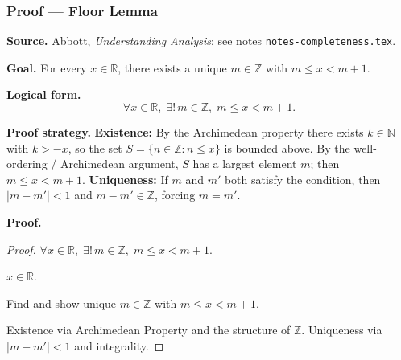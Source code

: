 
\clearpage
{}
\hypertarget{proof-RA-ABB-P-floor-lemma}{}

\subsubsection[Floor Lemma]{Proof --- Floor Lemma}

\bigskip

\noindent
\textbf{Source.}
Abbott, \emph{Understanding Analysis}; see notes \texttt{notes-completeness.tex}.

\vspace{0.75em}

\noindent
\textbf{Goal.}
For every $x \in \mathbb{R}$, there exists a unique $m \in \mathbb{Z}$ with
$m \le x < m + 1$.

\vspace{0.75em}

\noindent
\textbf{Logical form.}
\[
  \forall x \in \mathbb{R},\; \exists!\, m \in \mathbb{Z},\; m \le x < m+1.
\]

\vspace{0.75em}

\noindent
\textbf{Proof strategy.}
\textbf{Existence:} By the Archimedean property there exists $k \in \mathbb{N}$
with $k > -x$, so the set $S = \{n \in \mathbb{Z} : n \le x\}$ is bounded
above. By the well-ordering / Archimedean argument, $S$ has a largest element
$m$; then $m \le x < m + 1$.
\textbf{Uniqueness:} If $m$ and $m'$ both satisfy the condition, then
$|m - m'| < 1$ and $m - m' \in \mathbb{Z}$, forcing $m = m'$.

\vspace{0.75em}

\noindent
\textbf{Proof.}
\begin{proof}
\Claim $\forall x \in \mathbb{R},\; \exists!\, m \in \mathbb{Z},\; m \le x < m+1$.

\Given $x \in \mathbb{R}$.

\Goal Find and show unique $m \in \mathbb{Z}$ with $m \le x < m+1$.

\Strategy Existence via Archimedean Property and the structure of $\mathbb{Z}$.
Uniqueness via $|m - m'| < 1$ and integrality.

\medskip



\end{proof}

